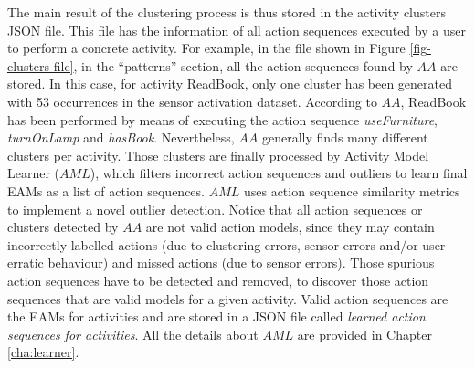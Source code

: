 The main result of the clustering process is thus stored in the activity clusters JSON file. This file has the information of all action sequences executed by a user to perform a concrete activity. For example, in the file shown in Figure \ref{fig-clusters-file}, in the ``patterns'' section, all the action sequences found by $AA$ are stored. In this case, for activity ReadBook, only one cluster has been generated with 53 occurrences in the sensor activation dataset. According to $AA$, ReadBook has been performed by means of executing the action sequence \textit{useFurniture}, \textit{turnOnLamp} and \textit{hasBook}. Nevertheless, $AA$ generally finds many different clusters per activity. Those clusters are finally processed by Activity Model Learner ($AML$), which filters incorrect action sequences and outliers to learn final EAMs as a list of action sequences. $AML$ uses action sequence similarity metrics to implement a novel outlier detection. Notice that all action sequences or clusters detected by $AA$ are not valid action models, since they may contain incorrectly labelled actions (due to clustering errors, sensor errors and/or user erratic behaviour) and missed actions (due to sensor errors). Those spurious action sequences have to be detected and removed, to discover those action sequences that are valid models for a given activity. Valid action sequences are the EAMs for activities and are stored in a JSON file called \textit{learned action sequences for activities}. All the details about $AML$ are provided in Chapter \ref{cha:learner}.